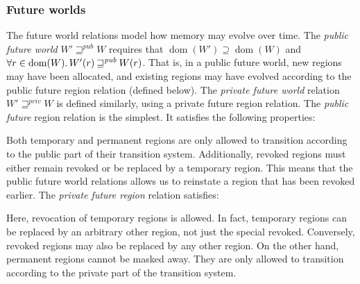 \documentclass{llncs}
\DeclareMathOperator{\dom}{dom}
\newcommand\lau[1]{{\color{purple} \sf \footnotesize {LS: #1}}\\}
\newcommand\dominique[1]{{\color{purple} \sf \footnotesize {DD: #1}}\\}
\renewcommand\lau[1]{}
\renewcommand\dominique[1]{}
\newcommand{\var}[1]{\mathit{#1}}
\newcommand{\pub}{\var{pub}}
\newcommand{\futurewk}{\mathbin{\sqsupseteq}^{\var{pub}}}
\newcommand{\futurestr}{\mathbin{\sqsupseteq}^{\var{priv}}}
\newcommand{\plaindom}[1]{\mathrm{#1}}
\newcommand{\Regions}{\plaindom{Region}}
\newcommand{\plainview}[1]{\mathrm{#1}}
\newcommand{\temp}{\plainview{temp}}
\newcommand{\revoked}{\plainview{revoked}}
\begin{document}
\subsubsection{Future worlds}
\label{subsec:future-worlds} 
The future world relations model how memory may evolve over time. 
The \emph{public future world} $W' \futurewk W$ requires that $\dom(W') \supseteq
\dom(W)$ and $\forall r \in \dom(W) \ldotp W'(r) \futurewk W(r)$. That is, in a
public future world, new regions may have been allocated, and existing regions
may have evolved according to the public future region relation (defined below).
The \emph{private future world} relation $W' \futurestr W$ is defined similarly,
using a private future region relation. The \emph{public future} region relation is the simplest. It satisfies
the following properties:
Both temporary and permanent regions are only allowed to transition according to
the public part of their transition system. Additionally, revoked regions must
either remain revoked or be replaced by a temporary region. This means that the
public future world relations allows us to reinstate a region that has been revoked
earlier. The \emph{private future region} relation satisfies:
Here, revocation of temporary regions is allowed. In fact, temporary regions can
be replaced by an arbitrary other region, not just the special $\revoked$.
Conversely, $\revoked$ regions may also be replaced by any other region. On
the other hand, permanent regions cannot be masked away. They are only allowed
to transition according to the private part of the transition system.
\end{document}
